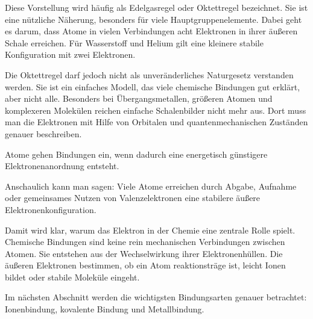 Diese Vorstellung wird häufig als Edelgasregel oder
Oktettregel bezeichnet. Sie ist eine nützliche Näherung,
besonders für viele Hauptgruppenelemente. Dabei geht es darum, dass Atome in
vielen Verbindungen acht Elektronen in ihrer äußeren Schale erreichen. Für
Wasserstoff und Helium gilt eine kleinere stabile Konfiguration mit zwei
Elektronen.

Die Oktettregel darf jedoch nicht als unveränderliches Naturgesetz verstanden
werden. Sie ist ein einfaches Modell, das viele chemische Bindungen gut
erklärt, aber nicht alle. Besonders bei Übergangsmetallen, größeren Atomen und
komplexeren Molekülen reichen einfache Schalenbilder nicht mehr aus. Dort
muss man die Elektronen mit Hilfe von Orbitalen und quantenmechanischen
Zuständen genauer beschreiben.

\begin{DidacticBox}
	\label{box:warum-atome-bindungen-eingehen}
	Atome gehen Bindungen ein, wenn dadurch eine energetisch günstigere
	Elektronenanordnung entsteht.
	
	Anschaulich kann man sagen: Viele Atome erreichen durch Abgabe, Aufnahme oder
	gemeinsames Nutzen von Valenzelektronen eine stabilere äußere
	Elektronenkonfiguration.
\end{DidacticBox}

Damit wird klar, warum das Elektron in der Chemie eine zentrale Rolle spielt.
Chemische Bindungen sind keine rein mechanischen Verbindungen zwischen Atomen.
Sie entstehen aus der Wechselwirkung ihrer Elektronenhüllen. Die äußeren
Elektronen bestimmen, ob ein Atom reaktionsträge ist, leicht Ionen bildet oder
stabile Moleküle eingeht.

Im nächsten Abschnitt werden die wichtigsten Bindungsarten genauer betrachtet:
Ionenbindung, kovalente Bindung und Metallbindung.